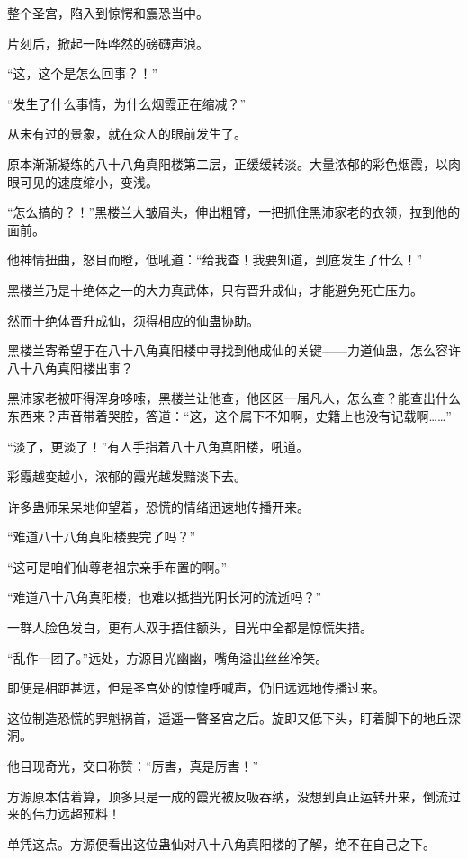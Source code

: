
\begin{this_body}

整个圣宫，陷入到惊愕和震恐当中。

片刻后，掀起一阵哗然的磅礴声浪。

“这，这个是怎么回事？！”

“发生了什么事情，为什么烟霞正在缩减？”

从未有过的景象，就在众人的眼前发生了。

原本渐渐凝练的八十八角真阳楼第二层，正缓缓转淡。大量浓郁的彩色烟霞，以肉眼可见的速度缩小，变浅。

“怎么搞的？！”黑楼兰大皱眉头，伸出粗臂，一把抓住黑沛家老的衣领，拉到他的面前。

他神情扭曲，怒目而瞪，低吼道：“给我查！我要知道，到底发生了什么！”

黑楼兰乃是十绝体之一的大力真武体，只有晋升成仙，才能避免死亡压力。

然而十绝体晋升成仙，须得相应的仙蛊协助。

黑楼兰寄希望于在八十八角真阳楼中寻找到他成仙的关键——力道仙蛊，怎么容许八十八角真阳楼出事？

黑沛家老被吓得浑身哆嗦，黑楼兰让他查，他区区一届凡人，怎么查？能查出什么东西来？声音带着哭腔，答道：“这，这个属下不知啊，史籍上也没有记载啊……”

“淡了，更淡了！”有人手指着八十八角真阳楼，吼道。

彩霞越变越小，浓郁的霞光越发黯淡下去。

许多蛊师呆呆地仰望着，恐慌的情绪迅速地传播开来。

“难道八十八角真阳楼要完了吗？”

“这可是咱们仙尊老祖宗亲手布置的啊。”

“难道八十八角真阳楼，也难以抵挡光阴长河的流逝吗？”

一群人脸色发白，更有人双手捂住额头，目光中全都是惊慌失措。

“乱作一团了。”远处，方源目光幽幽，嘴角溢出丝丝冷笑。

即便是相距甚远，但是圣宫处的惊惶呼喊声，仍旧远远地传播过来。

这位制造恐慌的罪魁祸首，遥遥一瞥圣宫之后。旋即又低下头，盯着脚下的地丘深洞。

他目现奇光，交口称赞：“厉害，真是厉害！”

方源原本估着算，顶多只是一成的霞光被反吸吞纳，没想到真正运转开来，倒流过来的伟力远超预料！

单凭这点。方源便看出这位蛊仙对八十八角真阳楼的了解，绝不在自己之下。


\end{this_body}
